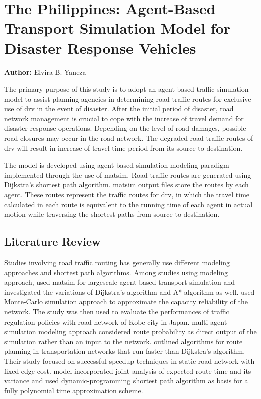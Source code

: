 \section{The Philippines: Agent-Based Transport Simulation Model for Disaster Response Vehicles}
\label{sec:philippines}
\hfill \textbf{Author:} Elvira B. Yaneza

The primary purpose of this study is to adopt an agent-based traffic simulation model to assist planning agencies in determining road traffic routes for exclusive use of \gls{drv} in the event of disaster. After the initial period of disaster, road network management is crucial to cope with the increase of travel demand for disaster response operations. Depending on the level of road damages, possible road closures may occur in the road network. The degraded road traffic routes of \gls{drv} will result in increase of travel time period from its source to destination.

The model is developed using agent-based simulation modeling paradigm implemented through the use of \gls{matsim}. Road traffic routes are generated using Dijkstra’s shortest path algorithm. \gls{matsim} output files store the routes by each agent. These routes represent the traffic routes for \gls{drv}, in which the travel time calculated in each route is equivalent to the running time of each agent in actual motion while traversing the shortest paths from source to destination. 

\subsection{Literature Review}
Studies involving road traffic routing has generally use different modeling approaches and shortest path algorithms. Among studies using modeling approach, \citet[][]{LefebvreBalmer_TechRep_IVT_2007} used \gls{matsim} for \gls{largescale} agent-based transport simulation and investigated the variations of Dijkstra’s algorithm and A*-algorithm as well. \citet[][]{SumaleeKurauchi_NSE_2006} used Monte-Carlo simulation approach to approximate the capacity reliability of the network. The study was then used to evaluate the performances of traffic regulation policies with road network of Kobe city in Japan. \citet[][]{Teknomo_TSSP_2008} multi-agent simulation modeling approach considered route probability as direct output of the simulation rather than an input to the network. \citet[][]{SandersSchultes_WEA_2007} outlined algorithms for route planning in transportation networks that run faster than Dijkstra’s algorithm. Their study focused on successful speedup techniques in static road network with fixed edge cost. \citet[][]{Elalouf_JSSM_2012} model incorporated joint analysis of expected route time and its variance and used dynamic-programming shortest path algorithm as basis for a fully polynomial time approximation scheme. 

